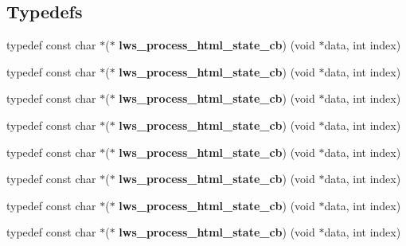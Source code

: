 \subsection*{Typedefs}
\begin{DoxyCompactItemize}
\item 
\mbox{\label{group__html-chunked-substitution_ga669d3d7ce2d5f193473f649a89b3e7ac}} 
typedef const char $\ast$($\ast$ {\bfseries lws\+\_\+process\+\_\+html\+\_\+state\+\_\+cb}) (void $\ast$data, int index)
\item 
\mbox{\label{group__html-chunked-substitution_ga669d3d7ce2d5f193473f649a89b3e7ac}} 
typedef const char $\ast$($\ast$ {\bfseries lws\+\_\+process\+\_\+html\+\_\+state\+\_\+cb}) (void $\ast$data, int index)
\item 
\mbox{\label{group__html-chunked-substitution_ga669d3d7ce2d5f193473f649a89b3e7ac}} 
typedef const char $\ast$($\ast$ {\bfseries lws\+\_\+process\+\_\+html\+\_\+state\+\_\+cb}) (void $\ast$data, int index)
\item 
\mbox{\label{group__html-chunked-substitution_ga669d3d7ce2d5f193473f649a89b3e7ac}} 
typedef const char $\ast$($\ast$ {\bfseries lws\+\_\+process\+\_\+html\+\_\+state\+\_\+cb}) (void $\ast$data, int index)
\item 
\mbox{\label{group__html-chunked-substitution_ga669d3d7ce2d5f193473f649a89b3e7ac}} 
typedef const char $\ast$($\ast$ {\bfseries lws\+\_\+process\+\_\+html\+\_\+state\+\_\+cb}) (void $\ast$data, int index)
\item 
\mbox{\label{group__html-chunked-substitution_ga669d3d7ce2d5f193473f649a89b3e7ac}} 
typedef const char $\ast$($\ast$ {\bfseries lws\+\_\+process\+\_\+html\+\_\+state\+\_\+cb}) (void $\ast$data, int index)
\item 
\mbox{\label{group__html-chunked-substitution_ga669d3d7ce2d5f193473f649a89b3e7ac}} 
typedef const char $\ast$($\ast$ {\bfseries lws\+\_\+process\+\_\+html\+\_\+state\+\_\+cb}) (void $\ast$data, int index)
\item 
\mbox{\label{group__html-chunked-substitution_ga669d3d7ce2d5f193473f649a89b3e7ac}} 
typedef const char $\ast$($\ast$ {\bfseries lws\+\_\+process\+\_\+html\+\_\+state\+\_\+cb}) (void $\ast$data, int index)
\end{DoxyCompactItemize}
